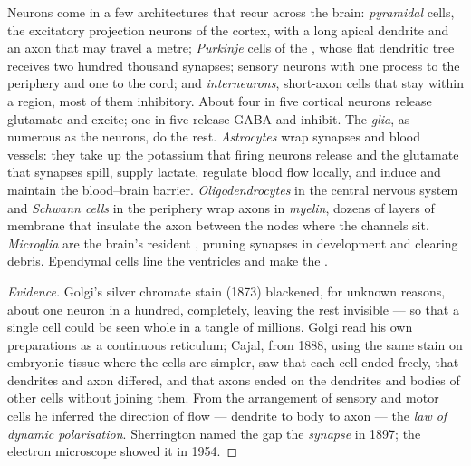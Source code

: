 \begin{definition}\label{def:b3:nervous-systems:cells}
Neurons come in a few architectures that recur across the brain:
\emph{pyramidal} cells, the excitatory projection neurons of the
cortex, with a long apical dendrite and an axon that may travel a
metre; \emph{Purkinje} cells of the , whose flat dendritic
tree receives two hundred thousand synapses; sensory neurons with one
process to the periphery and one to the cord; and \emph{interneurons},
short-axon cells that stay within a region, most of them inhibitory.
About four in five cortical neurons release glutamate and excite; one
in five release GABA and inhibit. The \emph{glia}, as numerous as the
neurons, do the rest. \emph{Astrocytes} wrap synapses and blood vessels:
they take up the potassium that firing neurons release and the
glutamate that synapses spill, supply lactate, regulate blood flow
locally, and induce and maintain the blood--brain barrier.
\emph{Oligodendrocytes} in the central nervous system and \emph{Schwann
cells} in the periphery wrap axons in \emph{myelin}, dozens of layers
of membrane that insulate the axon between the nodes where the channels
sit. \emph{Microglia} are the brain's resident , pruning
synapses in development and clearing debris. Ependymal cells line the
ventricles and make the .
\end{definition}

\begin{proof}[Evidence]
Golgi's silver chromate stain (1873) blackened, for unknown reasons,
about one neuron in a hundred, completely, leaving the rest invisible
--- so that a single cell could be seen whole in a tangle of millions.
Golgi read his own preparations as a continuous reticulum; Cajal, from
1888, using the same stain on embryonic tissue where the cells are
simpler, saw that each cell ended freely, that dendrites and axon
differed, and that axons ended on the dendrites and bodies of other
cells without joining them. From the arrangement of sensory and motor
cells he inferred the direction of flow --- dendrite to body to axon ---
the \emph{law of dynamic polarisation}. Sherrington named the gap the
\emph{synapse} in 1897; the electron microscope showed it in 1954.
\end{proof}

